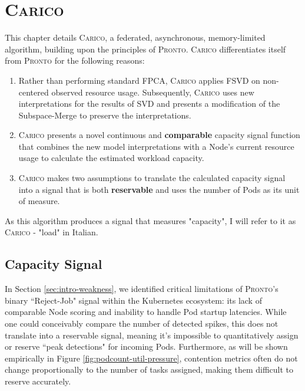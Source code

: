 \chapter{\protect\textsc{Carico}}
This chapter details \textsc{Carico}, a federated, asynchronous,
memory-limited algorithm, building upon the principles of \textsc{Pronto}.
\textsc{Carico} differentiates itself from \textsc{Pronto} for the following
reasons:
\begin{enumerate}
    \item Rather than performing standard FPCA, \textsc{Carico} applies FSVD on
        non-centered observed resource usage. Subsequently, \textsc{Carico} uses
        new interpretations for the results of SVD and presents a modification
        of the Subspace-Merge to preserve the interpretations.
    \item \textsc{Carico} presents a novel continuous and \textbf{comparable}
        capacity signal function that combines the new model interpretations
        with a Node's current resource usage to calculate the estimated workload
        capacity.
    \item \textsc{Carico} makes two assumptions to translate the calculated
        capacity signal into a signal that is both \textbf{reservable} and uses
        the number of Pods as its unit of measure.
\end{enumerate}
As this algorithm produces a signal that measures "capacity", I will refer to it
as \textsc{Carico} - "load" in Italian.

\section{Capacity Signal}
In Section \ref{sec:intro-weakness}, we identified critical limitations of
\textsc{Pronto}'s binary ``Reject-Job" signal within the Kubernetes ecosystem:
its lack of comparable Node scoring and inability to handle Pod startup
latencies. While one could conceivably compare the number of detected spikes,
this does not translate into a reservable signal, meaning it's impossible to
quantitatively assign or reserve ``peak detections" for incoming Pods.
Furthermore, as will be shown empirically in Figure
\ref{fig:podcount-util-pressure}, contention metrics often do not change
proportionally to the number of tasks assigned, making them difficult to
reserve accurately.

